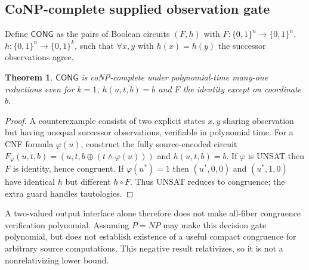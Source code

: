 \documentclass[11pt]{article}
\newtheorem{theorem}{Theorem}
\begin{document}
\subsection{CoNP-complete supplied observation gate}
Define $\mathsf{CONG}$ as the pairs of Boolean circuits $(F,h)$ with $F:\{0,1\}^n\to\{0,1\}^n$, $h:\{0,1\}^n\to\{0,1\}^k$, such that $\forall x,y$ with $h(x)=h(y)$ the successor observations agree. 
\begin{theorem} $\mathsf{CONG}$ is coNP-complete under polynomial-time many-one reductions even for $k=1$, $h(u,t,b)=b$ and $F$ the identity except on coordinate $b$. \end{theorem}
\begin{proof} A counterexample consists of two explicit states $x,y$ sharing observation but having unequal successor observations, verifiable in polynomial time. For a CNF formula $\varphi(u)$, construct the fully source-encoded circuit $F_\varphi(u,t,b)=(u,t,b\oplus(t\wedge\varphi(u)))$ and $h(u,t,b)=b$. If $\varphi$ is UNSAT then $F$ is identity, hence congruent. If $\varphi(u^*)=1$ then $(u^*,0,0)$ and $(u^*,1,0)$ have identical $h$ but different $h\circ F$. Thus UNSAT reduces to congruence; the extra guard handles tautologies. \end{proof}
A two-valued output interface alone therefore does not make all-fiber congruence verification polynomial. Assuming $P=NP$ may make this decision gate polynomial, but does not establish existence of a useful compact congruence for arbitrary source computations. This negative result relativizes, so it is not a nonrelativizing lower bound.
\end{document}

